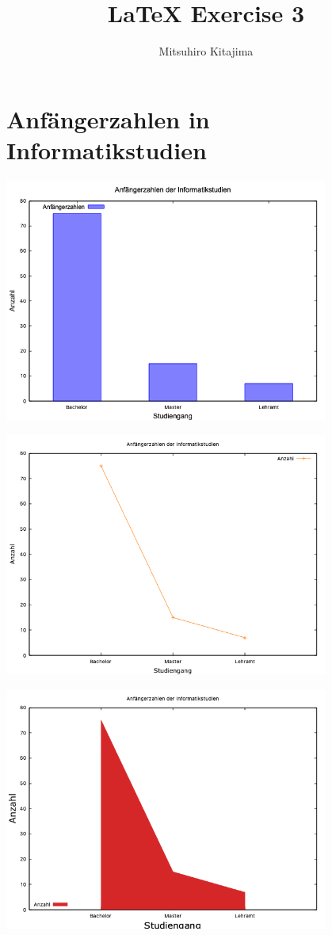 \documentclass{article}
\title{LaTeX Exercise 3}
\author{Mitsuhiro Kitajima}
\begin{document}
    \maketitle
    \section{Anfängerzahlen in Informatikstudien}

    \begin{center}
        \includegraphics[width=0.8\textwidth]{bar}
    \end{center}

    \begin{center}
        \includegraphics[width=0.8\textwidth]{linespoints}
    \end{center}

    \begin{center}
        \includegraphics[width=0.8\textwidth]{filled}
    \end{center}
\end{document}
